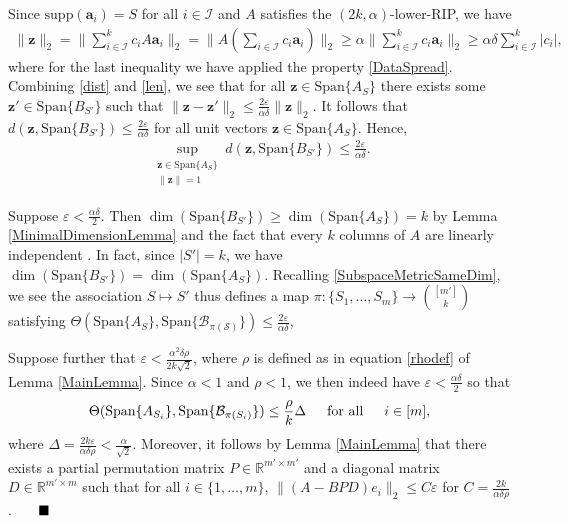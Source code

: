 \documentclass[journal,onecolumn]{IEEEtran}
\begin{document}
Since $\text{supp}(\mathbf{a}_i) = S$ for all $i \in \mathcal{I}$ and $A$ satisfies the $(2k,\alpha)$-lower-RIP, we have 
\begin{align}\label{len}
\|\mathbf{z}\|_2 = \|\sum_{i \in \mathcal{I}}^k c_i A \mathbf{a}_i\|_2 
= \|A (\sum_{i \in \mathcal{I}} c_i \mathbf{a}_i) \|_2 
\geq \alpha \|\sum_{i \in \mathcal{I}}^k c_i \mathbf{a}_i\|_2 
\geq \alpha\delta \sum_{i \in \mathcal{I}}^k |c_i|,
\end{align}
%
where for the last inequality we have applied the property \eqref{DataSpread}. Combining \eqref{dist} and \eqref{len}, we see that for all $\mathbf{z} \in \text{Span}\{A_S\}$ there exists some $\mathbf{z}' \in \text{Span}\{B_{S'}\}$ such that $\|\mathbf{z} - \mathbf{z}'\|_2 \leq \frac{ 2 \varepsilon }{ \alpha \delta } \|\mathbf{z}\|_2$. It follows that $d(\mathbf{z}, \text{Span}\{B_{S'}\}) \leq \frac{ 2 \varepsilon }{ \alpha \delta }$ for all unit vectors $\mathbf{z} \in \text{Span}\{A_S\}$. Hence,
\begin{align}\label{ABSubspaceDistance}
\sup_{ \substack{ \mathbf{z} \in \text{Span}\{A_{S}\} \\ \|\mathbf{z}\| = 1} } d(\mathbf{z}, \text{Span}\{B_{S'}\}) \leq \frac{ 2 \varepsilon }{ \alpha \delta }.
\end{align}

Suppose $\varepsilon < \frac{\alpha\delta}{2}$. Then $\dim(\text{Span}\{B_{S'}\}) \geq \dim(\text{Span}\{A_S\}) = k$ by Lemma \ref{MinimalDimensionLemma} and the fact that every $k$ columns of $A$ are linearly independent . In fact, since $|S'| = k$, we have $\dim(\text{Span}\{B_{S'}\}) = \dim(\text{Span}\{A_S\})$. Recalling \eqref{SubspaceMetricSameDim},  we see the association $S \mapsto S'$ thus defines a map $\pi: \{S_1, \ldots, S_m\} \to {[m'] \choose k}$ satisfying $\Theta(\text{Span}\{A_S\}, \text{Span}\{\mathcal{B_{\pi(S)}}\}) \leq \frac{ 2 \varepsilon }{ \alpha \delta }$,

Suppose further that $\varepsilon < \frac{\alpha^2\delta\rho}{2k\sqrt{2}}$, where $\rho$ is defined as in equation \eqref{rhodef} of Lemma \ref{MainLemma}. Since $\alpha < 1$ and $\rho < 1$, we then indeed have $\varepsilon < \frac{\alpha\delta}{2}$ so that 
\begin{align}\label{SubspaceDistanceUpperBound}
\Theta(\text{Span}\{A_{S_i}\}, \text{Span}\{\mathcal{B}_{\pi(S_i)}\}) \leq \frac{\rho}{k}\Delta
\indent \text{for all} \indent i \in [m],
\end{align}
%
where $\Delta = \frac{2k\varepsilon}{\alpha\delta\rho} < \frac{\alpha}{\sqrt{2}}$. Moreover, it follows by Lemma \ref{MainLemma} that there exists a partial permutation matrix $P \in \mathbb{R}^{m' \times m'}$ and a diagonal matrix $D \in \mathbb{R}^{m' \times m}$ such that for all $i \in \{1, \ldots, m\}$,
$\|(A - BPD)e_i\|_2 \leq C\varepsilon$ for $C = \frac{2k}{\alpha\delta\rho}$. $\indent \blacksquare$
\end{document}
